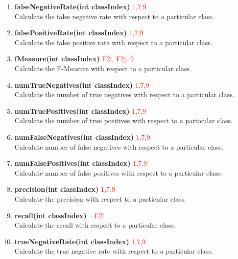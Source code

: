 \documentclass[a4paper,12pt]{article}
\begin{document}
\begin{enumerate}
\begin{enumerate}
\item \textbf{falseNegativeRate(int classIndex)} \textcolor{red}{1,7,9}
          \\Calculate the false negative rate with respect to a particular class. 
          
\item \textbf{falsePositiveRate(int classIndex)} \textcolor{red}{1,7,9}
          \\Calculate the false positive rate with respect to a particular class. 
          
\item \textbf{fMeasure(int classIndex)} \textcolor{red}{F2i, F2j, 9}
          \\Calculate the F-Measure with respect to a particular class.
          
\item \textbf{numTrueNegatives(int classIndex)} \textcolor{red}{1,7,9}
          \\Calculate the number of true negatives with respect to a particular class.
          
\item \textbf{numTruePositives(int classIndex)} \textcolor{red}{1,7,9}
         \\ Calculate the number of true positives with respect to a particular class. 
\item \textbf{numFalseNegatives(int classIndex)} \textcolor{red}{1,7,9}
         \\ Calculate number of false negatives with respect to a particular class. 
          
\item \textbf{numFalsePositives(int classIndex)} \textcolor{red}{1,7,9}
         \\ Calculate number of false positives with respect to a particular class. 
          
\item \textbf{precision(int classIndex)} \textcolor{red}{1,7,9}
         \\ Calculate the precision with respect to a particular class.      
          
\item \textbf{recall(int classIndex)} \textcolor{red}{=F2l}
         \\ Calculate the recall with respect to a particular class. 
          
\item \textbf{trueNegativeRate(int classIndex)} \textcolor{red}{1,7,9}
          \\Calculate the true negative rate with respect to a particular class.
          

\end{enumerate}
\end{enumerate}
\end{document}

